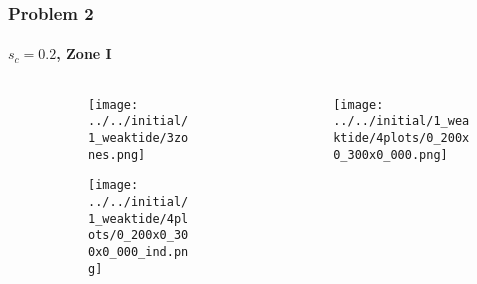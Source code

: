 \documentclass[dvipsnames, 11pt]{beamer}
\begin{document}
\begin{frame}
    \frametitle{Problem 2}
    \framesubtitle{$s_c = 0.2$, Zone I}

    \begin{columns}
        \begin{column}{0.5\textwidth}
            \begin{figure}
                \centering
                \begin{subfigure}{\columnwidth}
                    \centering
                    \texttt{[image: ../../initial/1\_weaktide/3zones.png]}
                \end{subfigure}

                \begin{subfigure}{\columnwidth}
                    \centering
                    \texttt{[image: ../../initial/1\_weaktide/4plots/0\_200x0\_300x0\_000\_ind.png]}
                \end{subfigure}
            \end{figure}
        \end{column}
        \begin{column}{0.5\textwidth}
            \begin{figure}[t]
                \centering
                \texttt{[image: ../../initial/1\_weaktide/4plots/0\_200x0\_300x0\_000.png]}
            \end{figure}
        \end{column}
    \end{columns}
\end{frame}
\end{document}
